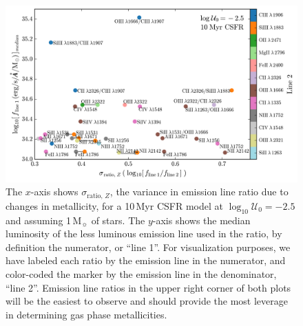 \documentclass[preprint2,trackchanges]{aastex62}
\newcommand{\sigmaRZ}{\ensuremath{\sigma_{\mathrm{ratio,}\,Z}}\xspace}
\newcommand\Msun{\ensuremath{\mathrm{M_{\sun}}}\xspace}
\newcommand{\Myr}{$\,$Myr\xspace}
\newcommand{\logten}{\ensuremath{\log_{10}}}
\newcommand{\logUeq}[1]{\ensuremath{\logten \mathcal{U}_0 = #1}}
\begin{document}
\begin{figure}
  \begin{center}
    \includegraphics[width=\linewidth]{figs/f7.png}
    \caption{The $x$-axis shows \sigmaRZ, the variance in emission line ratio due to changes in metallicity, for a 10\Myr CSFR model at \logUeq{-2.5} and assuming 1\,\Msun of stars. The $y$-axis shows the median luminosity of the less luminous emission line used in the ratio, by definition the numerator, or ``line 1''. For visualization purposes, we have labeled each ratio by the emission line in the numerator, and color-coded the marker by the emission line in the denominator, ``line 2''.  Emission line ratios in the upper right corner of both plots will be the easiest to observe and should provide the most leverage in determining gas phase metallicities.}
    \label{fig:ratioSigmaZ}
  \end{center}
\end{figure}
\end{document}
